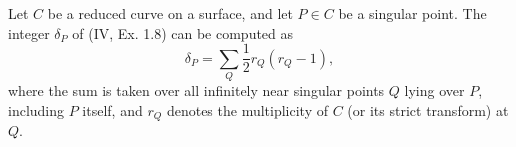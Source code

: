 Let $C$ be a reduced curve on a surface, and let $P \in C$ be a singular point. The integer $\delta_P$ of (IV, Ex. 1.8) can be computed as
$$\delta_P = \sum_Q \frac{1}{2} r_Q(r_Q - 1),$$
where the sum is taken over all infinitely near singular points $Q$ lying over $P$, including $P$ itself, and $r_Q$ denotes the multiplicity of $C$ (or its strict transform) at $Q$.
